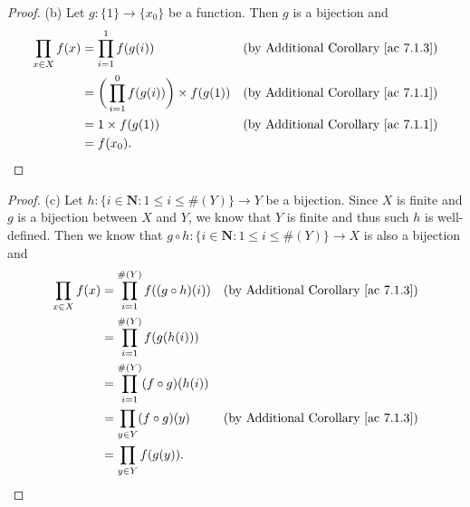 \begin{proof}{(b)}
    Let \(g : \{1\} \to \{x_0\}\) be a function.
    Then \(g\) is a bijection and
    \begin{align*}
        \prod_{x \in X} f(x) & = \prod_{i = 1}^1 f(g(i))                            & \text{(by Additional Corollary \ref{ac 7.1.3})} \\
                             & = \bigg(\prod_{i = 1}^0 f(g(i))\bigg) \times f(g(1)) & \text{(by Additional Corollary \ref{ac 7.1.1})} \\
                             & = 1 \times f(g(1))                                   & \text{(by Additional Corollary \ref{ac 7.1.1})} \\
                             & = f(x_0).
    \end{align*}
\end{proof}

\begin{proof}{(c)}
    Let \(h : \{i \in \mathbf{N} : 1 \leq i \leq \#(Y)\} \to Y\) be a bijection.
    Since \(X\) is finite and \(g\) is a bijection between \(X\) and \(Y\), we know that \(Y\) is finite and thus such \(h\) is well-defined.
    Then we know that \(g \circ h : \{i \in \mathbf{N} : 1 \leq i \leq \#(Y)\} \to X\) is also a bijection and
    \begin{align*}
        \prod_{x \in X} f(x) & = \prod_{i = 1}^{\#(Y)} f((g \circ h)(i)) & \text{(by Additional Corollary \ref{ac 7.1.3})} \\
                             & = \prod_{i = 1}^{\#(Y)} f(g(h(i)))                                                          \\
                             & = \prod_{i = 1}^{\#(Y)} (f \circ g)(h(i))                                                   \\
                             & = \prod_{y \in Y} (f \circ g)(y)          & \text{(by Additional Corollary \ref{ac 7.1.3})} \\
                             & = \prod_{y \in Y} f(g(y)).
    \end{align*}
\end{proof}

